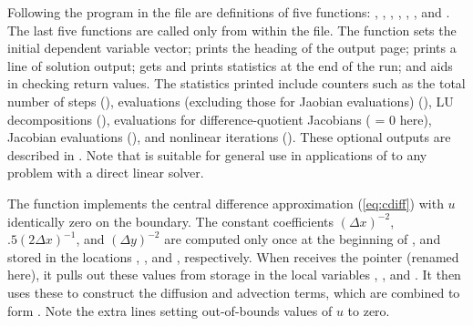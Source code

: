 Following the  program in the  file are definitions of
five functions: , , , , ,
, and .   The last five functions are called
only from within the  file.
The  function sets the initial dependent variable vector;
 prints the heading of the output page;
 prints a line of solution output;
 gets and prints statistics at the end of the run;
and  aids in checking return values.  The statistics
printed include counters such as the total number of steps (), 
 evaluations (excluding those for Jaobian evaluations) (),
LU decompositions (),  evaluations for
difference-quotient Jacobians ( = 0 here),
Jacobian evaluations (), and nonlinear iterations ().
These optional outputs are described in .
Note that  is suitable for general use in applications
of {\cvode} to any problem with a direct linear solver.

The  function implements the central difference approximation
(\ref{eq:cdiff}) with $u$ identically zero on the boundary. 
The constant coefficients $(\Delta x)^{-2}$, $.5(2 \Delta x)^{-1}$, and 
$(\Delta y)^{-2}$ are computed only once at the beginning of , 
and stored in the locations , , and
, respectively.   When  receives the 
pointer (renamed  here), it pulls out these values from storage
in the local variables , , and .  It then
uses these to construct the diffusion and advection terms, which are
combined to form .  Note the extra lines setting out-of-bounds
values of $u$ to zero.

